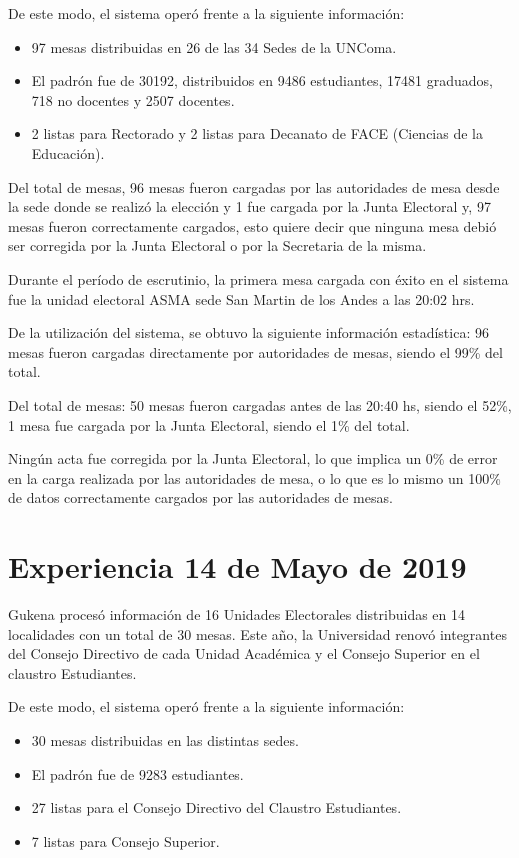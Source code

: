 De este modo, el sistema operó frente a la siguiente información:

\begin{itemize}
    \item 97 mesas distribuidas en 26 de las 34 Sedes de la UNComa.
     \item El padrón fue de  30192, distribuidos en 9486 estudiantes, 17481 graduados, 718 no docentes y 2507 docentes.
     \item 2 listas para Rectorado y 2 listas para Decanato de FACE (Ciencias de la Educación).
\end{itemize}

Del total de mesas, 96 mesas fueron cargadas por las autoridades de mesa desde la sede donde se realizó la elección y 1 fue cargada por la Junta Electoral y, 97 mesas fueron correctamente cargados, esto quiere decir que ninguna mesa debió ser corregida por la Junta Electoral o por la Secretaria de la misma.

Durante el período de escrutinio, la primera mesa cargada con éxito en el sistema fue la unidad electoral ASMA sede San Martin de los Andes a las 20:02 hrs.

De la utilización del sistema, se obtuvo la siguiente información estadística:
96 mesas fueron cargadas directamente por autoridades de mesas, siendo el 99\% del total.

Del total de mesas:
50 mesas fueron cargadas antes de las 20:40 hs, siendo el 52\%,
1 mesa fue cargada 	por la Junta Electoral, siendo el 1\% del total.

Ningún acta fue corregida por la Junta Electoral, lo que implica un 0\% de error en la carga realizada por las autoridades de mesa, o lo que es lo mismo un 100\% de datos correctamente cargados por las autoridades de mesas.

\section{Experiencia 14 de Mayo de 2019}
Gukena procesó información de 16 Unidades Electorales distribuidas en 14 localidades con un total de 30 mesas. Este año, la Universidad renovó integrantes del Consejo Directivo de cada Unidad Académica y el Consejo Superior en el claustro Estudiantes.

De este modo, el sistema operó frente a la siguiente información:
\begin{itemize}
    \item 30 mesas distribuidas en las distintas sedes.
     \item El padrón fue de  9283 estudiantes.
     \item 27 listas para el Consejo Directivo del Claustro Estudiantes.
     \item 7 listas para Consejo Superior.
\end{itemize}

